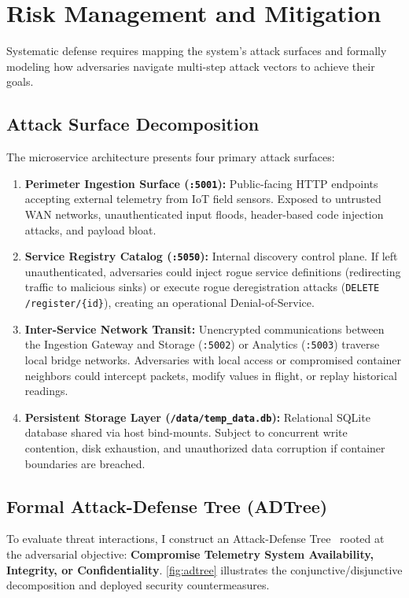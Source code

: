 \section{Risk Management and Mitigation}
\label{sec:risk_management}

Systematic defense requires mapping the system's attack surfaces and formally modeling how adversaries navigate multi-step attack vectors to achieve their goals.

\subsection{Attack Surface Decomposition}
The microservice architecture presents four primary attack surfaces:
\begin{enumerate}
    \item \textbf{Perimeter Ingestion Surface (\texttt{:5001}):} Public-facing HTTP endpoints accepting external telemetry from IoT field sensors. Exposed to untrusted WAN networks, unauthenticated input floods, header-based code injection attacks, and payload bloat.
    \item \textbf{Service Registry Catalog (\texttt{:5050}):} Internal discovery control plane. If left unauthenticated, adversaries could inject rogue service definitions (redirecting traffic to malicious sinks) or execute rogue deregistration attacks (\texttt{DELETE /register/\{id\}}), creating an operational Denial-of-Service.
    \item \textbf{Inter-Service Network Transit:} Unencrypted communications between the Ingestion Gateway and Storage (\texttt{:5002}) or Analytics (\texttt{:5003}) traverse local bridge networks. Adversaries with local access or compromised container neighbors could intercept packets, modify values in flight, or replay historical readings.
    \item \textbf{Persistent Storage Layer (\texttt{/data/temp\_data.db}):} Relational SQLite database shared via host bind-mounts. Subject to concurrent write contention, disk exhaustion, and unauthorized data corruption if container boundaries are breached.
\end{enumerate}

\subsection{Formal Attack-Defense Tree (ADTree)}
To evaluate threat interactions, I construct an Attack-Defense Tree~\citep{kordy2014dag} rooted at the adversarial objective: \textbf{Compromise Telemetry System Availability, Integrity, or Confidentiality}. \cref{fig:adtree} illustrates the conjunctive/disjunctive decomposition and deployed security countermeasures.

